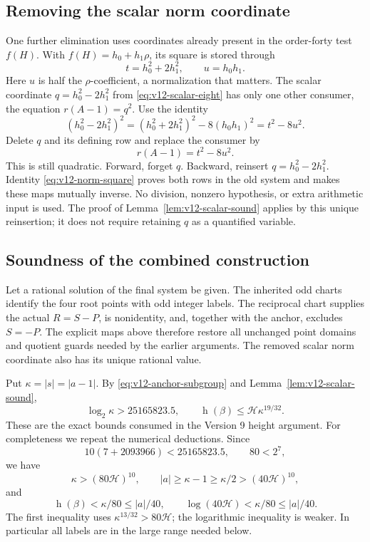 \subsection{Removing the scalar norm coordinate}\label{subsec:v12-norm-elim}

One further elimination uses coordinates already present in the
order-forty test $f(H)$.  With $f(H)=h_0+h_1\rho$, its square is stored
through
\[
 t=h_0^2+2h_1^2,\qquad u=h_0h_1.
\]
Here $u$ is half the $\rho$-coefficient, a normalization that matters.
The scalar coordinate $q=h_0^2-2h_1^2$ from
\eqref{eq:v12-scalar-eight} has only one other consumer, the equation
$r(A-1)=q^2$.  Use the identity
\begin{equation}\label{eq:v12-norm-square}
 (h_0^2-2h_1^2)^2=(h_0^2+2h_1^2)^2-8(h_0h_1)^2=t^2-8u^2.
\end{equation}
Delete $q$ and its defining row and replace the consumer by
\[
 r(A-1)=t^2-8u^2.
\]
This is still quadratic.  Forward, forget $q$.  Backward, reinsert
$q=h_0^2-2h_1^2$.  Identity \eqref{eq:v12-norm-square} proves both
rows in the old system and makes these maps mutually inverse.
No division, nonzero hypothesis, or extra arithmetic input is used.
The proof of Lemma~\ref{lem:v12-scalar-sound} applies by this unique
reinsertion; it does not require retaining $q$ as a quantified variable.

\subsection{Soundness of the combined construction}
\label{subsec:v12-soundness}

Let a rational solution of the final system be given.  The inherited
odd charts identify the four root points with odd integer labels.
The reciprocal chart supplies the actual $R=S-P$, is nonidentity,
and, together with the anchor, excludes $S=-P$.  The explicit maps
above therefore restore all unchanged point domains and quotient
guards needed by the earlier arguments.  The removed scalar norm
coordinate also has its unique rational value.

Put $\kappa=|s|=|a-1|$.  By
\eqref{eq:v12-anchor-subgroup} and Lemma~\ref{lem:v12-scalar-sound},
\[
 \log_2\kappa>25165823.5,\qquad
 \operatorname h(\beta)\le\mathcal H\kappa^{19/32}.
\]
These are the exact bounds consumed in the Version 9 height argument.
For completeness we repeat the numerical deductions.  Since
\[
 10(7+2093966)<25165823.5,\qquad80<2^7,
\]
we have
\[
 \kappa>(80\mathcal H)^{10},\qquad
 |a|\ge\kappa-1\ge\kappa/2>(40\mathcal H)^{10},
\]
and
\begin{equation}\label{eq:v12-margins}
 \operatorname h(\beta)<\kappa/80\le|a|/40,\qquad
 \log(40\mathcal H)<\kappa/80\le|a|/40.
\end{equation}
The first inequality uses
$\kappa^{13/32}>80\mathcal H$; the logarithmic inequality is weaker.
In particular all labels are in the large range needed below.


